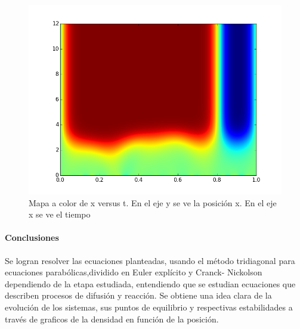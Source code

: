\documentclass[prl,showpacs]{revtex4-1}
\begin{document}
\begin{figure}
\begin{center}
\includegraphics[width=5in]{p2lindo.png}
\caption{ Mapa a color de x versus t. En el eje y se ve la posici\'on x. En el eje x se ve el tiempo }
\label{ }
\end{center}
\end{figure}

\newpage
\paragraph{Conclusiones}
Se logran resolver las ecuaciones planteadas, usando el m\'etodo tridiagonal para ecuaciones parab\'olicas,dividido en Euler expl\'icito y Cranck- Nickolson dependiendo de la etapa estudiada, entendiendo que se estudian ecuaciones que describen procesos de difusi\'on y reacci\'on. Se obtiene una idea clara de la evoluci\'on de los sistemas, sus puntos de equilibrio y respectivas estabilidades a trav\'es de graficos de la densidad en funci\'on de la posici\'on.
\end{document}

